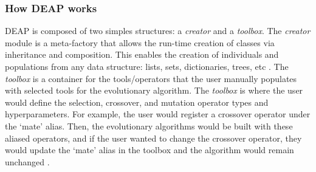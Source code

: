 \subsubsection{How \gls{DEAP} works}
\label{sec:deap-works}
\gls{DEAP} is composed of two simples structures: a \textit{creator} and a 
\textit{toolbox}.  
The \textit{creator} module is a meta-factory that allows the run-time creation 
of classes via inheritance and composition. 
This enables the creation of individuals and populations from any data structure: 
lists, sets, dictionaries, trees, etc \cite{fortin_deap_2012}. 
The \textit{toolbox} is a container for the tools/operators that the user 
manually populates with selected tools for the evolutionary algorithm.
The \textit{toolbox} is where the user would define the selection, crossover, 
and mutation operator types and hyperparameters. 
For example, the user would register a crossover operator under the `mate'
alias. 
Then, the evolutionary algorithms would be built with these aliased operators, 
and if the user wanted to change the crossover operator, they would update the 
`mate' alias in the toolbox and the algorithm would remain unchanged
\cite{fortin_deap_2012}. 

